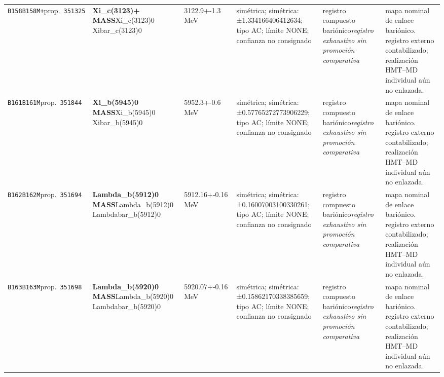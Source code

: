 \begin{landscape}
\begin{longtable}{L{1.85cm}L{4.45cm}L{2.35cm}L{4.05cm}L{3.35cm}L{7.15cm}}
\texttt{B158}\newline \texttt{B158M+}\newline prop.\ \texttt{351325} & \textbf{Xi\_\allowbreak{}c(3123)+ MASS}\newline Xi\_\allowbreak{}c(3123)0 \textbar{}\allowbreak{} Xibar\_\allowbreak{}c(3123)0 & 3122.9+-1.3\,MeV & simétrica; simétrica: ±1.334166406412634; tipo AC; límite NONE; confianza no consignado & registro compuesto bariónico\newline \emph{registro exhaustivo sin promoción comparativa} & mapa nominal de enlace bariónico. registro externo contabilizado; realización HMT--MD individual aún no enlazada. \\
\texttt{B161}\newline \texttt{B161M}\newline prop.\ \texttt{351844} & \textbf{Xi\_\allowbreak{}b(5945)0 MASS}\newline Xi\_\allowbreak{}b(5945)0 \textbar{}\allowbreak{} Xibar\_\allowbreak{}b(5945)0 & 5952.3+-0.6\,MeV & simétrica; simétrica: ±0.57765272773906229; tipo AC; límite NONE; confianza no consignado & registro compuesto bariónico\newline \emph{registro exhaustivo sin promoción comparativa} & mapa nominal de enlace bariónico. registro externo contabilizado; realización HMT--MD individual aún no enlazada. \\
\texttt{B162}\newline \texttt{B162M}\newline prop.\ \texttt{351694} & \textbf{Lambda\_\allowbreak{}b(5912)0 MASS}\newline Lambda\_\allowbreak{}b(5912)0 \textbar{}\allowbreak{} Lambdabar\_\allowbreak{}b(5912)0 & 5912.16+-0.16\,MeV & simétrica; simétrica: ±0.16007003100330261; tipo AC; límite NONE; confianza no consignado & registro compuesto bariónico\newline \emph{registro exhaustivo sin promoción comparativa} & mapa nominal de enlace bariónico. registro externo contabilizado; realización HMT--MD individual aún no enlazada. \\
\texttt{B163}\newline \texttt{B163M}\newline prop.\ \texttt{351698} & \textbf{Lambda\_\allowbreak{}b(5920)0 MASS}\newline Lambda\_\allowbreak{}b(5920)0 \textbar{}\allowbreak{} Lambdabar\_\allowbreak{}b(5920)0 & 5920.07+-0.16\,MeV & simétrica; simétrica: ±0.15862170338385659; tipo AC; límite NONE; confianza no consignado & registro compuesto bariónico\newline \emph{registro exhaustivo sin promoción comparativa} & mapa nominal de enlace bariónico. registro externo contabilizado; realización HMT--MD individual aún no enlazada. \\

\end{longtable}
\end{landscape}
